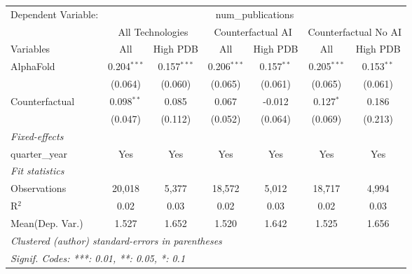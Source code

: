 \begingroup
\centering
\begin{tabular}{lcccccc}
   \tabularnewline \midrule \midrule
   Dependent Variable: & \multicolumn{6}{c}{num\_publications}\\
 & \multicolumn{2}{c}{All Technologies} & \multicolumn{2}{c}{Counterfactual AI} & \multicolumn{2}{c}{Counterfactual No AI} \\
\cmidrule(lr){1-1}\cmidrule(lr){2-3} \cmidrule(lr){4-5} \cmidrule(lr){6-7}
Variables & \multicolumn{1}{c}{All} & \multicolumn{1}{c}{High PDB} & \multicolumn{1}{c}{All} & \multicolumn{1}{c}{High PDB} & \multicolumn{1}{c}{All} & \multicolumn{1}{c}{High PDB} \\
\cmidrule(lr){1-1}\cmidrule(lr){2-2} \cmidrule(lr){3-3} \cmidrule(lr){4-4} \cmidrule(lr){5-5} \cmidrule(lr){6-6} \cmidrule(lr){7-7}
   AlphaFold      & 0.204$^{***}$ & 0.157$^{***}$ & 0.206$^{***}$ & 0.157$^{**}$ & 0.205$^{***}$ & 0.153$^{**}$\\   
                  & (0.064)       & (0.060)       & (0.065)       & (0.061)      & (0.065)       & (0.061)\\   
   Counterfactual & 0.098$^{**}$  & 0.085         & 0.067         & -0.012       & 0.127$^{*}$   & 0.186\\   
                  & (0.047)       & (0.112)       & (0.052)       & (0.064)      & (0.069)       & (0.213)\\   
   \midrule
   \emph{Fixed-effects}\\
   quarter\_year  & Yes           & Yes           & Yes           & Yes          & Yes           & Yes\\  
   \midrule
   \emph{Fit statistics}\\
   Observations   & 20,018        & 5,377         & 18,572        & 5,012        & 18,717        & 4,994\\  
   R$^2$          & 0.02          & 0.03          & 0.02          & 0.03         & 0.02          & 0.03\\  
Mean(Dep. Var.) & 1.527 & 1.652 & 1.520 & 1.642 & 1.525 & 1.656 \\
   \midrule \midrule
   \multicolumn{7}{l}{\emph{Clustered (author) standard-errors in parentheses}}\\
   \multicolumn{7}{l}{\emph{Signif. Codes: ***: 0.01, **: 0.05, *: 0.1}}\\
\end{tabular}
\par\endgroup
